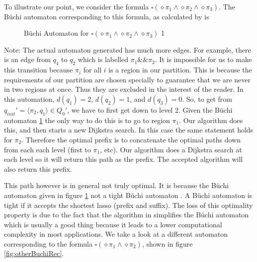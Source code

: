 To illustrate our point, we consider the formula $\square(\diamond \pi_1 \land \diamond \pi_2 \land \diamond \pi_3)$. The B\"{u}chi automaton corresponding to this formula, as calculated by \cite{gastin01} is 

\begin{figure}
\centering
{}
\caption{B\"uchi Automaton for $\square(\diamond \pi_1 \land \diamond \pi_2 \land \diamond \pi_3)$ 1}
\label{fig:gasBuchiRec}
\end{figure}
Note: The actual automaton generated has much more edges. For example, there is an edge from $q_4$ to $q_2$ which is labelled $\pi_1 \&\& \pi_2$. It is impossible for us to make this transition because $\pi_i$ for all $i$ is a region in our partition. This is because the requirements of our partition are chosen specially to guarantee that we are never in two regions at once. Thus they are excluded in the interest of the reader. In this automation, $d(q_1)=2$, $d(q_2)=1$, and $d(q_3)=0$. So, to get from $q_{init}' = \langle \pi_2, q_1 \rangle \in Q_0'$, we have to first get down to level 2. Given the B\"{u}chi automaton \ref{fig:gasBuchiRec} the only way to do this is to go to region $\pi_1$. Our algorithm does this, and then starts a new Dijkstra search. In this case the same statement holds for $\pi_2$. Therefore the optimal prefix is to concatenate the optimal paths down from each each level (first to $\pi_1$, etc). Our algorithm does a Dijkstra search at each level so it will return this path as the prefix. The accepted algorithm will also return this prefix. 

This path however is in general not truly optimal. It is because the B\"{u}chi automaton given in figure \ref{fig:gasBuchiRec} not a tight B\"{u}chi automaton \cite{schuppan05}. A B\"{u}chi automaton is tight if it accepts the shortest lasso (prefix and suffix). The loss of this optimality property is due to the fact that the algorithm in \cite{gastin01} simplifies the B\"{u}chi automaton which is usually a good thing because it leads to a lower computational complexity in most applications. We take a look at a different automaton corresponding to the formula $\square(\diamond \pi_1 \land \diamond \pi_2)$, shown in figure \ref{fig:otherBuchiRec}. 

